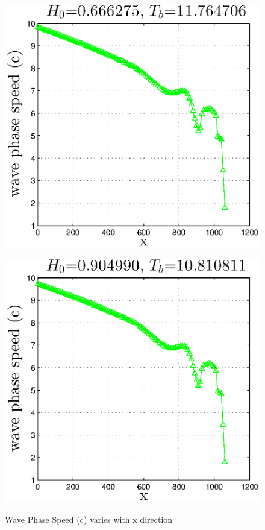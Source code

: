 
\begin{figure}[H]
\begin{minipage}[b]{0.47\linewidth}
\centering
\includegraphics[width=\textwidth]{forward_plot/p1_4.eps}
\label{Figc_1}
\end{minipage}
\hspace{0.2cm}
\begin{minipage}[b]{0.47\linewidth}
\centering
\includegraphics[width=\textwidth]{forward_plot/p2_4.eps}
\label{Figc_2}
\end{minipage}
\caption{Wave Phase Speed (c) varies with x direction}
\end{figure}

